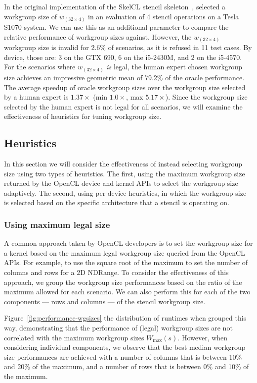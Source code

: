 In the original implementation of the SkelCL stencil
skeleton~\cite{Breuer2013}, \citeauthor{Breuer2013} selected a
workgroup size of $w_{(32 \times 4)}$ in an evaluation of 4 stencil
operations on a Tesla S1070 system. We can use this as an additional
parameter to compare the relative performance of workgroup sizes
against. However, the $w_{(32 \times 4)}$ workgroup size is invalid
for 2.6\% of scenarios, as it is refused in 11 test cases. By device,
those are: 3 on the GTX 690, 6 on the i5-2430M, and 2 on the i5-4570.
For the scenarios where $w_{(32 \times 4)}$ \emph{is} legal, the human
expert chosen workgroup size achieves an impressive geometric mean of
79.2\% of the oracle performance. The average speedup of oracle
workgroup sizes over the workgroup size selected by a human expert is
$1.37\times$ (min $1.0\times$, max $5.17\times$). Since the workgroup
size selected by the human expert is not legal for all scenarios, we
will examine the effectiveness of heuristics for tuning workgroup
size.


\subsection{Heuristics}\label{subsec:heuristics}

In this section we will consider the effectiveness of instead
selecting workgroup size using two types of heuristics. The first,
using the maximum workgroup size returned by the OpenCL device and
kernel APIs to select the workgroup size adaptively. The second, using
per-device heuristics, in which the workgroup size is selected based
on the specific architecture that a stencil is operating on.

\subsubsection{Using maximum legal size}

A common approach taken by OpenCL developers is to set the workgroup
size for a kernel based on the maximum legal workgroup size queried
from the OpenCL APIs. For example, to use the square root of the
maximum to set the number of columns and rows for a 2D NDRange. To
consider the effectiveness of this approach, we group the workgroup
size performances based on the ratio of the maximum allowed for each
scenario. We can also perform this for each of the two components ---
rows and columns --- of the stencil workgroup
size.

Figure~\ref{fig:performance-wgsizes} the distribution of runtimes when
grouped this way, demonstrating that the performance of (legal)
workgroup sizes are not correlated with the maximum workgroup sizes
$W_{\max}(s)$. However, when considering individual components, we
observe that the best median workgroup size performances are achieved
with a number of columns that is between 10\% and 20\% of the maximum,
and a number of rows that is between 0\% and 10\% of the maximum.


